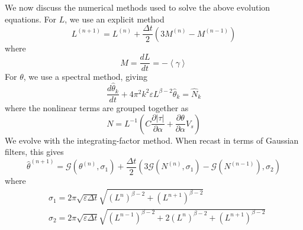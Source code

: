 \documentclass[11pt]{article}
\newcommand{\pd}[2]    { \frac{\partial #1} {\partial #2} }
\newcommand{\td}[2] { \frac{d #1} { d #2 } }
\newcommand{\abs}[1]{\left| #1 \right|}
\newcommand{\mean}[1]{\left< #1 \right>}
\newcommand{\eps}{\varepsilon}
\newcommand{\atau}{\abs{\tau}}
\newcommand{\thh}{\hat{\theta}}
\newcommand{\GG}{\mathcal{G}}
\newcommand{\Dt}{\Delta t}
\begin{document}
We now discuss the numerical methods used to solve the above evolution equations. For $L$, we use an explicit method
\begin{equation}
L^{(n+1)} = L^{(n)} + \frac{\Dt}{2} \left( 3 M^{(n)} - M^{(n-1)} \right)
\end{equation}
where
\begin{equation}
M = \td{L}{t} = -\mean{\gamma}
\end{equation}
For $\theta$, we use a spectral method, giving
\begin{equation}
\td{\thh_k}{t} + 4 \pi^2 k^2 \eps L^{\beta-2} \thh_k = \hat{N}_k
\end{equation}
where the nonlinear terms are grouped together as
\begin{equation}
N = L^{-1} \left( C \pd{\atau}{\alpha} + \pd{\theta}{\alpha} V_s \right)
\end{equation}
We evolve with the integrating-factor method. When recast in terms of Gaussian filters, this gives
\begin{equation}
\label{intfact}
\thh^{(n+1)} = \GG(\theta^{(n)}, \sigma_1) 
+ \frac{\Dt}{2} \left( 3 \GG(N^{(n)}, \sigma_1) - \GG(N^{(n-1)}), \sigma_2 \right)
\end{equation}
where
\begin{align}
& \sigma_1 = 2 \pi \sqrt{\eps \Dt} \sqrt{(L^{n})^{\beta-2} + (L^{n+1})^{\beta-2} } 	\\
& \sigma_2 = 2 \pi \sqrt{\eps \Dt} \sqrt{(L^{n-1})^{\beta-2} + 2 (L^{n})^{\beta-2} + (L^{n+1})^{\beta-2} }
\end{align}
\end{document}
